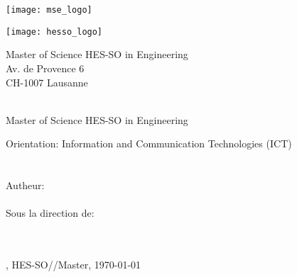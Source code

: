 
\begin{titlepage}
	\begin{flushright}
		\begin{minipage}{0.5\textwidth}
			\begin{flushleft}
				\texttt{[image: mse\_logo]}
			\end{flushleft}
		\end{minipage}%
		\begin{minipage}{0.5\textwidth}
			\begin{flushright}
				\texttt{[image: hesso\_logo]}
			\end{flushright}
		\end{minipage}
		\begin{flushleft}
			\footnotesize
			Master of Science HES-SO in Engineering \\
			Av. de Provence 6 \\
			CH-1007 Lausanne
		\end{flushleft}
		~\\[0.5cm]
		
		{
		\Huge Master of Science HES-SO in Engineering\\[0.5cm]
		}
		
		{
		\LARGE Orientation: Information and Communication Technologies (ICT)\\[0.5cm]
		~\\[1cm]
		}
		{
			\Huge
			\ThesisTitle \\[1.5cm]
		}
		{
			\large
			Autheur:\\[-0.3cm]
			\Huge \Author \\[0.8cm]
		}
		{
			\large
			Sous la direction de: \\
			\Director \\
			\DirectorResearchUnit \\[0.5cm]
		}
		\vfill
		
		{\large \Place, HES-SO//Master, \today}
		
	\end{flushright}
\end{titlepage}


